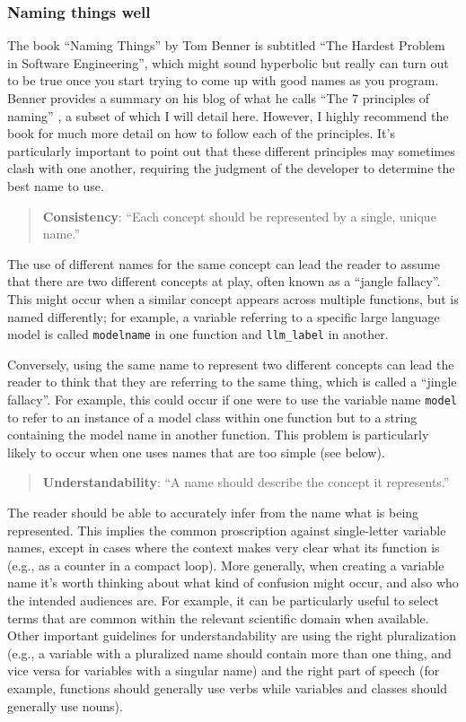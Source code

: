 \subsubsection{Naming things well}

The book ``Naming Things'' \citep{benner:2023} by Tom Benner is subtitled ``The Hardest Problem in Software Engineering'', which might sound hyperbolic but really can turn out to be true once you start trying to come up with good names as you program.
Benner provides a summary on his blog of what he calls ``The 7 principles of naming'' \citep{benner:2023blog}, a subset of which I will detail here.
However, I highly recommend the book for much more detail on how to follow each of the principles.
It's particularly important to point out that these different principles may sometimes clash with one another, requiring the judgment of the developer to determine the best name to use.

\begin{quote}
\textbf{Consistency}: ``Each concept should be represented by a single, unique name.''
\end{quote}

The use of different names for the same concept can lead the reader to assume that there are two different concepts at play, often known as a ``jangle fallacy''.
This might occur when a similar concept appears across multiple functions, but is named differently; for example, a variable referring to a specific large language model is called \texttt{modelname} in one function and \texttt{llm\_label} in another.

Conversely, using the same name to represent two different concepts can lead the reader to think that they are referring to the same thing, which is called a ``jingle fallacy''. For example, this could occur if one were to use the variable name \texttt{model} to refer to an instance of a model class within one function but to a string containing the model name in another function.
This problem is particularly likely to occur when one uses names that are too simple (see below).

\begin{quote}
\textbf{Understandability}: ``A name should describe the concept it represents.''
\end{quote}

The reader should be able to accurately infer from the name what is being represented.
This implies the common proscription against single-letter variable names, except in cases where the context makes very clear what its function is (e.g., as a counter in a compact loop).
More generally, when creating a variable name it's worth thinking about what kind of confusion might occur, and also who the intended audiences are.
For example, it can be particularly useful to select terms that are common within the relevant scientific domain when available.
Other important guidelines for understandability are using the right pluralization (e.g., a variable with a pluralized name should contain more than one thing, and vice versa for variables with a singular name) and the right part of speech (for example, functions should generally use verbs while variables and classes should generally use nouns).

